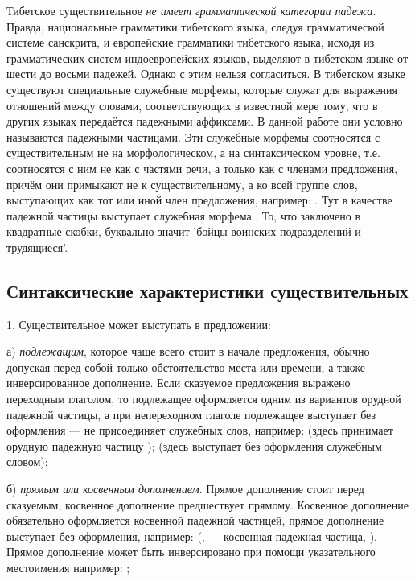 \label{page71}Тибетское существительное \emph{не имеет грамматической категории падежа}. Правда, национальные грамматики тибетского языка, следуя грамматической системе санскрита, и европейские грамматики тибетского языка, исходя из грамматических систем индоевропейских языков, выделяют в тибетском языке от шести до восьми падежей. Однако с этим нельзя согласиться. В тибетском языке существуют специальные служебные морфемы, которые служат для выражения отношений между словами, соответствующих в известной мере тому, что в других языках передаётся падежными аффиксами. В данной работе они условно называются падежными частицами. Эти служебные морфемы соотносятся с существительным не на морфологическом, а на синтаксическом уровне, т.е. соотносятся с ним не как с частями речи, а только как с членами предложения, причём они примыкают не к существительному, а ко всей группе слов, выступающих как тот или иной член предложения, например:
. Тут в качестве падежной частицы выступает
служебная морфема . То, что заключено в квадратные скобки, буквально значит 'бойцы воинских подразделений и трудящиеся'.

\subsection{Синтаксические характеристики существительных}

1. Существительное может выступать в предложении:

а) \emph{подлежащим}, которое чаще всего стоит в начале предложения, обычно допуская перед собой только обстоятельство места или времени, а также инверсированное дополнение. Если сказуемое предложения выражено переходным глаголом, то подлежащее оформляется одним из вариантов орудной падежной частицы, а при непереходном глаголе подлежащее выступает без оформления --- не присоединяет служебных слов, например:
 (здесь   принимает орудную падежную частицу );
 (здесь  выступает без оформления служебным словом);

б) \emph{прямым или косвенным дополнением}. Прямое дополнение стоит перед сказуемым, косвенное дополнение предшествует прямому. Косвенное дополнение обязательно оформляется косвенной падежной частицей, прямое дополнение выступает без оформления, например:
 (,  --- косвенная падежная частица, ). Прямое дополнение может быть инверсировано при помощи указательного местоимения  например:
;

